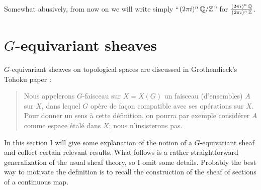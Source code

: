 Somewhat abusively, from now on we will write simply ``$(2\pi i)^n\,\mathbb{Q}/\mathbb{Z}$''
for $\frac{(2\pi i)^n\,\mathbb{Q}}{(2\pi i)^n\,\mathbb{Z}}$.


\section{$G$-equivariant sheaves}
\label{section:equivariant-sheaves}

$G$-equivariant sheaves on topological spaces are discussed in Grothendieck's
Tohoku paper \cite{Tohoku-paper}:

\begin{quote}
  Nous appelerons $G$-faisceau sur $X = X(G)$ un faisceau (d'ensembles) $A$
  sur $X$, dans lequel $G$ opère de façon compatible avec ses opérations
  sur $X$. Pour donner un sens à cette définition, on pourra par exemple
  considérer $A$ comme espace étalé dans $X$; nous n'insisterons pas.
\end{quote}

In this section I will give some explanation of the notion of a $G$-equivariant
sheaf and collect certain relevant results. What follows is a rather
straightforward generalization of the usual sheaf theory, so I omit some
details. Probably the best way to motivate the definition is to recall the
construction of the sheaf of sections of a continuous map.

